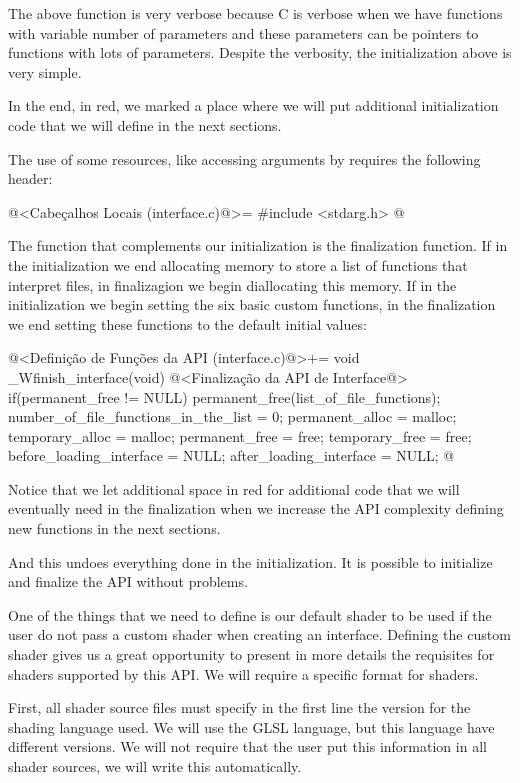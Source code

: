 The above function is very verbose because C is verbose when we have
functions with variable number of parameters and these parameters can
be pointers to functions with lots of parameters. Despite the
verbosity, the initialization above is very simple.

In the end, in red, we marked a place where we will put additional
initialization code that we will define in the next sections.

The use of some resources, like accessing arguments by
 requires the following header:

\iniciocodigo
@<Cabeçalhos Locais (interface.c)@>=
#include <stdarg.h>
@
\fimcodigo


The function that complements our initialization is the finalization
function. If in the initialization we end allocating memory to store a
list of functions that interpret files, in finalizagion we begin
diallocating this memory. If in the initialization we begin setting
the six basic custom functions, in the finalization we end setting
these functions to the default initial values:

\iniciocodigo
@<Definição de Funções da API (interface.c)@>+=
void _Wfinish_interface(void){
  @<Finalização da API de Interface@>
  if(permanent_free != NULL)
    permanent_free(list_of_file_functions);
  number_of_file_functions_in_the_list = 0;
  permanent_alloc = malloc;
  temporary_alloc = malloc;
  permanent_free = free;
  temporary_free = free;
  before_loading_interface = NULL;
  after_loading_interface = NULL;
}
@
\fimcodigo

Notice that we let additional space in red for additional code that we
will eventually need in the finalization when we increase the API
complexity defining new functions in the next sections.

And this undoes everything done in the initialization. It is possible
to initialize and finalize the API without problems.


One of the things that we need to define is our default shader to be
used if the user do not pass a custom shader when creating an
interface. Defining the custom shader gives us a great opportunity to
present in more details the requisites for shaders supported by this
API. We will require a specific format for shaders.

First, all shader source files must specify in the first line the
version for the shading language used. We will use the GLSL language,
but this language have different versions. We will not require that
the user put this information in all shader sources, we will write
this automatically.

